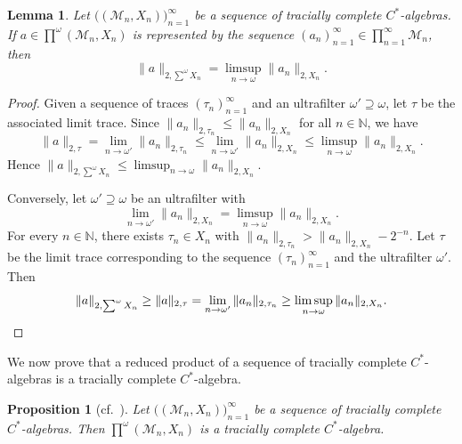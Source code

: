 \documentclass[a4paper,11pt]{amsart}
\newtheorem{lemma}[theorem]{Lemma}
\newtheorem{proposition}[theorem]{Proposition}
\theoremstyle{definition}
\numberwithin{equation}{section}
\numberwithin{theorem}{section}
\newcommand{\N}{\mathbb N}
\newcommand{\M}{\mathcal{M}}
\begin{document}
\begin{lemma}\label{lem:2norm-reducedproduct}
Let $\big((\M_n, X_n)\big)_{n=1}^\infty$ be a sequence of tracially complete $C^*$-algebras. If $a \in \prod^\omega (\M_n, X_n)$ is represented by the sequence $(a_n)_{n=1}^\infty \in \prod_{n=1}^\infty \M_n$, then
\begin{equation}
	\|a\|_{2,\sum^{\omega} X_n} = \limsup_{n\to\omega} \|a_n\|_{2,X_n}.
\end{equation}
\end{lemma}
\begin{proof}
Given a sequence of traces $(\tau_n)_{n=1}^\infty$ and an ultrafilter $\omega' \supseteq \omega$, let $\tau$ be the associated limit trace.
Since $\|a_n\|_{2,\tau_n} \leq \|a_n\|_{2,X_n}$ for all $n \in \N$, we have 
\begin{equation}
	\|a\|_{2,\tau} = \lim_{n\to\omega'}\|a_n\|_{2,\tau_n} \leq \lim_{n\to\omega'}\|a_n\|_{2,X_n} \leq \limsup_{n \to\omega} \|a_n\|_{2,X_n}.
\end{equation}
Hence $\|a\|_{2, \sum^\omega X_n} \leq \limsup_{n \to\omega} \|a_n\|_{2,X_n}$. 

Conversely, let $\omega' \supseteq \omega$ be an ultrafilter with 
\begin{equation}
\lim_{n\to\omega'} \|a_n\|_{2,X_n} = \limsup_{n\to\omega} \|a_n\|_{2,X_n}.
\end{equation}
For every $n \in \N$, there exists $\tau_n \in X_n$ with $\|a_n\|_{2,\tau_n} > \|a_n\|_{2,X_n} - 2^{-n}$. Let $\tau$ be the limit trace corresponding to the sequence $(\tau_n)_{n=1}^\infty$ and the ultrafilter $\omega'$. Then
\begin{equation}
\|a\|_{2, \sum^\omega X_n} \geq \|a\|_{2,\tau} = \lim_{n \to\omega'} \|a_n\|_{2,\tau_n} \geq \limsup_{n\to\omega}\|a_n\|_{2,X_n}.\qedhere
\end{equation}
\end{proof}

We now prove that a reduced product of a sequence of tracially complete $C^*$-algebras is a tracially complete $C^*$-algebra.


\begin{proposition}[{cf.\ \cite[Lemma~1.6]{CETWW}}]\label{prop:reduced-product}
Let $\big((\M_n, X_n)\big)_{n=1}^\infty$ be a sequence of tracially complete $C^*$-algebras. Then $\prod^\omega (\M_n, X_n)$ is a tracially complete $C^*$-algebra.
\end{proposition} 
\end{document}
